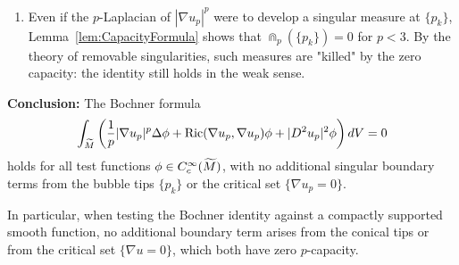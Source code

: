 \begin{theorem}
\begin{enumerate}
    \item[\textbf{Step 6: Capacity Removes Singular Contribution.}] Even if the $p$-Laplacian of $|\nabla u_p|^p$ were to develop a singular measure at $\{p_k\}$, Lemma~\ref{lem:CapacityFormula} shows that $\Cap_p(\{p_k\}) = 0$ for $p < 3$. By the theory of removable singularities, such measures are "killed" by the zero capacity: the identity still holds in the weak sense.
\end{enumerate}

\textbf{Conclusion:} The Bochner formula
\begin{equation}
    \int_{\widetilde{M}} \left( \frac{1}{p} |\nabla u_p|^p \Delta \phi + \mathrm{Ric}(\nabla u_p, \nabla u_p) \phi + |D^2 u_p|^2 \phi \right) dV = 0
\end{equation}
holds for all test functions $\phi \in C_c^\infty(\widetilde{M})$, with no additional singular boundary terms from the bubble tips $\{p_k\}$ or the critical set $\{\nabla u_p = 0\}$.
\end{theorem}

\begin{remark}
In particular, when testing the Bochner identity against a compactly
supported smooth function, no additional boundary term arises from the
conical tips or from the critical set $\{\nabla u=0\}$, which both have
zero $p$-capacity.
\end{remark}


